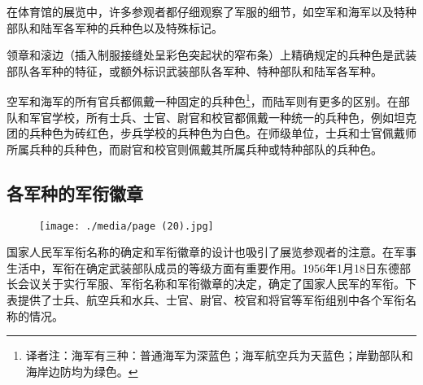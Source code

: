在体育馆的展览中，许多参观者都仔细观察了军服的细节，如空军和海军以及特种部队和陆军各军种的兵种色以及特殊标记。

领章和滚边（插入制服接缝处呈彩色突起状的窄布条）上精确规定的兵种色是武装部队各军种的特征，或额外标识武装部队各军种、特种部队和陆军各军种。

空军和海军的所有官兵都佩戴一种固定的兵种色\footnote{译者注：海军有三种：普通海军为深蓝色；海军航空兵为天蓝色；岸勤部队和海岸边防均为绿色。\cite{clarionv}}，而陆军则有更多的区别。在部队和军官学校，所有士兵、士官、尉官和校官都佩戴一种统一的兵种色，例如坦克团的兵种色为砖红色，步兵学校的兵种色为白色。在师级单位，士兵和士官佩戴师所属兵种的兵种色，而尉官和校官则佩戴其所属兵种或特种部队的兵种色。

\subsection{各军种的军衔徽章}

\begin{figure}
\texttt{[image: ./media/page (20).jpg]}
\end{figure}

国家人民军军衔名称的确定和军衔徽章的设计也吸引了展览参观者的注意。在军事生活中，军衔在确定武装部队成员的等级方面有重要作用。1956年1月18日东德部长会议关于实行军服、军衔名称和军衔徽章的决定，确定了国家人民军的军衔。下表提供了士兵、航空兵和水兵、士官、尉官、校官和将官等军衔组别中各个军衔名称的情况。


